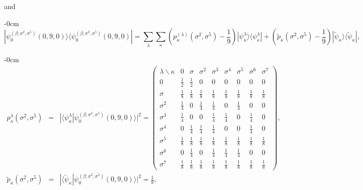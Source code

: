 \documentclass[quantumrep,article,accept,pdftex,moreauthors]{Definitions/mdpi}
\begin{document}
and
\begin{adjustwidth}{-\extralength}{0cm}
\begin{equation}
  |\psi_{0}^{(\beta;\sigma^{2},\sigma^{5})}(0,9,0)\rangle
  \langle \psi_{0}^{(\beta ; \sigma^{2},\sigma^{5})}(0,9,0)|
  = \sum_{\lambda }\sum_{\kappa} \left(
    p_{\kappa }^{(\lambda )}\left( \sigma ^{2},\sigma ^{5}\right) -\frac{1}{9}
  \right)
  |\psi_{\kappa}^{\lambda}\rangle \langle \psi_{\kappa}^{\lambda }|
  + \left( \tilde{p}_{\kappa }(\sigma ^{2},\sigma ^{5})-\frac{1}{9} \right)
  |\tilde{\psi}_{\kappa }\rangle \langle \tilde{\psi}_{\kappa }|,
  \label{nac recon}
\end{equation}
\end{adjustwidth}

\begin{adjustwidth}{-\extralength}{0cm}
\begin{eqnarray}
  p_{\kappa }^{\lambda }\left(\sigma^{2}, \sigma^{5}\right)
  &=& |\langle\psi_{\kappa }^{\lambda }
  |\psi_{0}^{(\beta ;\sigma ^{2},\sigma^{5})}(0,9,0)\rangle|^{2}
  = \left(\begin{array}{ccccccccc}
    \lambda \backslash \kappa  & 0 & \sigma  & \sigma ^{2} & \sigma ^{3} &
    \sigma ^{4} & \sigma ^{5} & \sigma ^{6} & \sigma ^{7} \\ 
    0 & \frac{1}{2} & \frac{1}{2} & 0 & 0 & 0 & 0 & 0 & 0 \\ [6pt]
    \sigma & \frac{1}{8} & \frac{1}{8} & \frac{1}{8} & \frac{1}{8} &
    \frac{1}{8} & \frac{1}{8} & \frac{1}{8} & \frac{1}{8} \\  [6pt]
    \sigma^{2} & \frac{1}{4} & 0 & \frac{1}{4} & \frac{1}{4} & 0 &
    \frac{1}{4} & 0 & 0 \\  [6pt]
    \sigma^{3} & \frac{1}{4} & 0 & 0 & \frac{1}{4} & \frac{1}{4} & 0 &
    \frac{1}{4} & 0 \\  [6pt]
    \sigma^{4} & 0 & \frac{1}{4} & \frac{1}{4} & \frac{1}{4} & 0 & 0 &
    \frac{1}{4} & 0 \\  [6pt]
    \sigma^{5} & \frac{1}{8} & \frac{1}{8} & \frac{1}{8} & \frac{1}{8} &
    \frac{1}{8} & \frac{1}{8} & \frac{1}{8} & \frac{1}{8} \\  [6pt]
    \sigma^{6} & 0 & \frac{1}{4} & 0 & \frac{1}{4} & \frac{1}{4} &
    \frac{1}{4} & 0 & 0 \\  [6pt]
    \sigma^{7} & \frac{1}{8} & \frac{1}{8} & \frac{1}{8} & \frac{1}{8} &
    \frac{1}{8} & \frac{1}{8} & \frac{1}{8} & \frac{1}{8}
  \end{array}\right), \\
  \tilde{p}_{\kappa }(\sigma^{2},\sigma^{5})
  &=& |\langle \tilde\psi_\kappa | \psi_0^{(\beta;\sigma^2,\sigma^5)}(0,9,0)\rangle|^2
  = \frac{1}{8},%
\end{eqnarray}
\end{adjustwidth}
\end{document}
